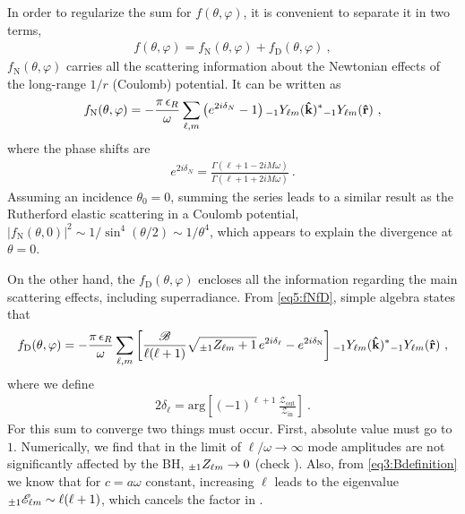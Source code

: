In order to regularize the sum for $f(\theta,\varphi)$, it is convenient to separate it in two terms,
\begin{align}
    \label{eq5:fNfD}
    f(\theta,\varphi) = f_\mathrm{N}(\theta,\varphi) + f_\mathrm{D}(\theta,\varphi) ~,
\end{align}
$f_\mathrm{N}(\theta,\varphi)$ carries all the scattering information about the Newtonian effects of the long-range $1/r$ (Coulomb) potential.
It can be written as
\begin{align}
    f_\mathrm{N}(\theta,\varphi) = - \frac{\pi \,\epsilon_R}{\omega}
    \sum_{\ell,m} \left( e^{2 i \delta_N } - 1 \right)
    \uu[-1]{Y}{\ell m}(\mathbf{\hat{k}})^{*} \uu[-1]{Y}{\ell m}(\mathbf{\hat{r}}) ~,
\end{align}
where the phase shifts are \cite{Futterman1988}
\begin{align}
    \label{eq5:phaseShiftN}
    e^{2 i \delta_N } = \frac{\Gamma(\ell + 1 - 2 i M \omega)}{\Gamma(\ell+1 + 2 i M \omega)} ~.
\end{align}
Assuming an incidence $\theta_0=0$, summing the series leads to a similar result as the Rutherford elastic scattering in a Coulomb potential, $|f_\mathrm{N}(\theta,0)|^2 \sim 1/\sin^{4}(\theta/2) \sim 1/\theta^4$, which appears to explain the divergence at $\theta=0$. 

On the other hand, the $f_\mathrm{D}(\theta,\varphi)$ encloses all the information regarding the main scattering effects, including superradiance.
From \eqref{eq5:fNfD}, simple algebra states that
\begin{align}
    \label{eq5:fD}
    f_\mathrm{D}(\theta,\varphi) = - \frac{\pi \,\epsilon_R}{\omega}
    \sum_{\ell,m} \left[ \frac{\mathscr{B}}{\ell(\ell+1)} \sqrt{ \uu[\pm 1]{Z}{\ell m} +1 } \,e^{2 i \delta_\ell } - e^{2 i \delta_\mathrm{N} } \right]
    \uu[-1]{Y}{\ell m}(\mathbf{\hat{k}})^{*} \uu[-1]{Y}{\ell m}(\mathbf{\hat{r}}) ~,
\end{align}
where we define
\begin{align}
    \label{eq5:phaseShiftD}
    2 \delta_\ell = \mathrm{arg} \left[ (-1)^{\ell+1} \,\frac{\mathscr{Z}_\mathrm{out}}{\mathscr{Z}_\mathrm{in}} \right] ~.
\end{align}
For this sum to converge two things must occur.
First, absolute value  must go to $1$.
Numerically, we find that in the limit of $\ell/\omega\to \infty$ mode amplitudes are not significantly affected by the BH, $\uu[\pm 1]{Z}{\ell m}\to 0$ (check ).
Also, from \eqref{eq3:Bdefinition} we know that for $c=a\omega$ constant, increasing $\ell$ leads to the eigenvalue $\uu[\pm 1]{\mathscr{E}}{\ell m} \sim \ell(\ell+1)$, which cancels the factor in .

